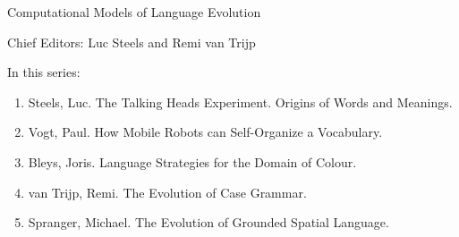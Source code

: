 
{\large Computational Models of Language Evolution}

\bigskip

Chief Editors: Luc Steels and Remi van Trijp \\

\bigskip

In this series:

\begin{enumerate}
\item Steels, Luc. The Talking Heads Experiment. Origins of Words and Meanings.
\item Vogt, Paul. How Mobile Robots can Self-Organize a Vocabulary.
\item Bleys, Joris. Language Strategies for the Domain of Colour.
\item van Trijp, Remi. The Evolution of Case Grammar.
\item Spranger, Michael. The Evolution of Grounded Spatial Language.
\end{enumerate}


